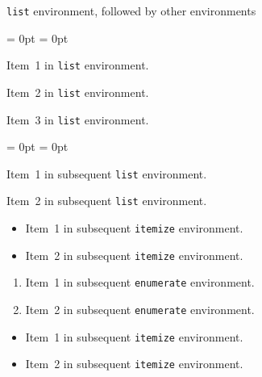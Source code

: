 \documentclass[aspectratio = 169, t, 10pt]{beamer}
\begin{document}
\begin{frame}{\texttt{list} environment, followed by other environments}

\begin{list}{}{\leftmargin = 0pt \itemindent = 0pt}
	\item Item~1 in \texttt{list} environment.
	\item Item~2 in \texttt{list} environment.
	\item Item~3 in \texttt{list} environment.
\end{list}

\begin{list}{}{\leftmargin = 0pt \itemindent = 0pt}
	\item Item~1 in subsequent \texttt{list} environment.
	\item Item~2 in subsequent \texttt{list} environment.
\end{list}

\begin{itemize}
	\item Item~1 in subsequent \texttt{itemize} environment.
	\item Item~2 in subsequent \texttt{itemize} environment.
\end{itemize}

\begin{enumerate}
	\item Item~1 in subsequent \texttt{enumerate} environment.
	\item Item~2 in subsequent \texttt{enumerate} environment.
\end{enumerate}

\begin{itemize}
	\item Item~1 in subsequent \texttt{itemize} environment.
	\item Item~2 in subsequent \texttt{itemize} environment.
\end{itemize}

\end{frame}
\end{document}
